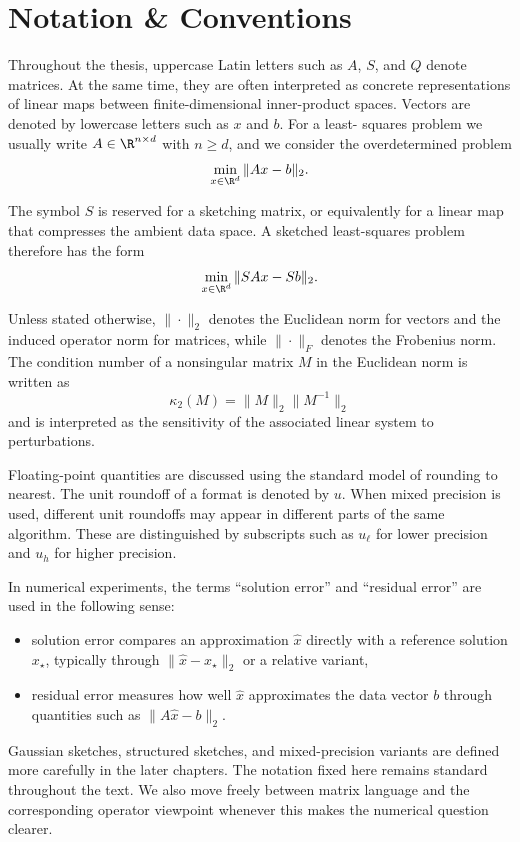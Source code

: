 \setcounter{chapter}{13} %
\chapter{Notation \& Conventions} \label{ch:notation}

Throughout the thesis, uppercase Latin letters such as \(A\), \(S\), and \(Q\)
denote matrices. At the same time, they are often interpreted as concrete
representations of linear maps between finite-dimensional inner-product spaces.
Vectors are denoted by lowercase letters such as \(x\) and \(b\). For a least-
squares problem we usually write \(A \in \R^{n \times d}\) with \(n \ge d\), and we
consider the overdetermined problem
\[
	\min_{x \in \R^d} \|Ax-b\|_2.
\]

The symbol \(S\) is reserved for a sketching matrix, or equivalently for a linear
map that compresses the ambient data space. A sketched least-squares problem
therefore has the form
\[
	\min_{x \in \R^d} \|SAx-Sb\|_2.
\]

Unless stated otherwise, \(\|\cdot\|_2\) denotes the Euclidean norm for vectors and
the induced operator norm for matrices, while \(\|\cdot\|_F\) denotes the Frobenius
norm. The condition number of a nonsingular matrix \(M\) in the Euclidean norm is
written as
\[
	\kappa_2(M) = \|M\|_2 \|M^{-1}\|_2
\]
and is interpreted as the sensitivity of the associated linear system to
perturbations.

Floating-point quantities are discussed using the standard model of rounding to
nearest. The unit roundoff of a format is denoted by \(u\). When mixed precision
is used, different unit roundoffs may appear in different parts of the same
algorithm. These are distinguished by subscripts such as \(u_\ell\) for lower
precision and \(u_h\) for higher precision.

In numerical experiments, the terms \enquote{solution error} and \enquote{residual error} are used in the following sense:
\begin{itemize}
	\item solution error compares an approximation \(\hat x\) directly with a reference solution \(x_\star\), typically through \(\|\hat x - x_\star\|_2\) or a relative variant,
	\item residual error measures how well \(\hat x\) approximates the data vector \(b\) through quantities such as \(\|A\hat x - b\|_2\).
\end{itemize}

Gaussian sketches, structured sketches, and mixed-precision variants are defined
more carefully in the later chapters. The notation fixed here remains standard
throughout the text. We also move freely between matrix language and the
corresponding operator viewpoint whenever this makes the numerical question
clearer.
